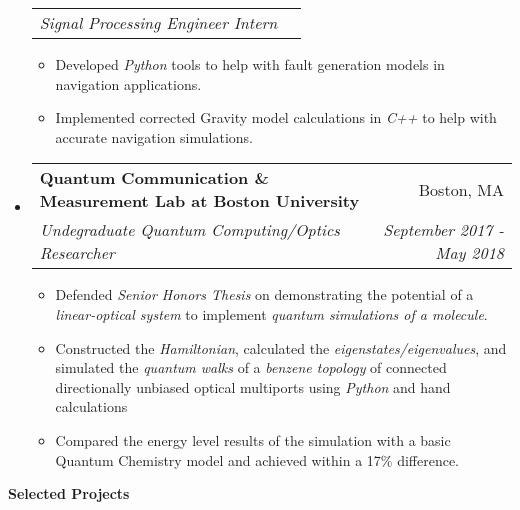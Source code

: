 \documentclass[letterpaper, 8pt]{extarticle}
\makeatletter
\newcommand{\resitem}[1]{\item #1 \vspace{-2pt}}
\newcommand{\resheading}[1]{{\large \colorbox{mygrey}{\begin{minipage}{0.99\textwidth}{\textbf{#1 \vphantom{p\^{E}}}}\end{minipage}}}}
\newcommand{\ressubheading}[4]{
\begin{tabular*}{7.40in}{l@{\extracolsep{\fill}}r}
		\textbf{#1} & #2 \\
		\textit{#3} & \textit{#4} \\
\end{tabular*}\vspace{-6pt}}
\newcommand{\rehead}[2]{
\begin{tabular*}{7.40in}{l@{\extracolsep{\fill}}r}
        \textit{#1} & \textit{#2} \\
\end{tabular*}\vspace{-6pt}}
\makeatother
\begin{document}
\begin{itemize}
\begin{itemize}
	\end{itemize}
	\vspace{-3pt}
	\rehead{Signal Processing Engineer Intern}{}
	\begin{itemize}
		\resitem{Developed \emph{Python} tools to help with fault generation models in navigation applications.}
		\resitem{Implemented corrected Gravity model calculations in \emph{C++} to help with accurate navigation simulations.}
	\end{itemize}
\item
	\ressubheading{Quantum Communication \& Measurement Lab at Boston University}{Boston, MA}{Undegraduate Quantum Computing/Optics Researcher}{September 2017 - May 2018}
	\begin{itemize}
	    \resitem{Defended \emph{Senior Honors Thesis} on demonstrating the potential of a \emph{linear-optical system} to implement \emph{quantum simulations of a molecule}.}
        \resitem{Constructed the \emph{Hamiltonian}, calculated the \emph{eigenstates/eigenvalues}, and simulated the \emph{quantum walks} of a \emph{benzene topology} of connected directionally unbiased optical multiports using \emph{Python} and hand calculations}
        \item{Compared the energy level results of the simulation with a basic Quantum Chemistry model and achieved within a 17\% difference. }
	\end{itemize}
\end{itemize}


\resheading{Selected Projects}
\end{document}
